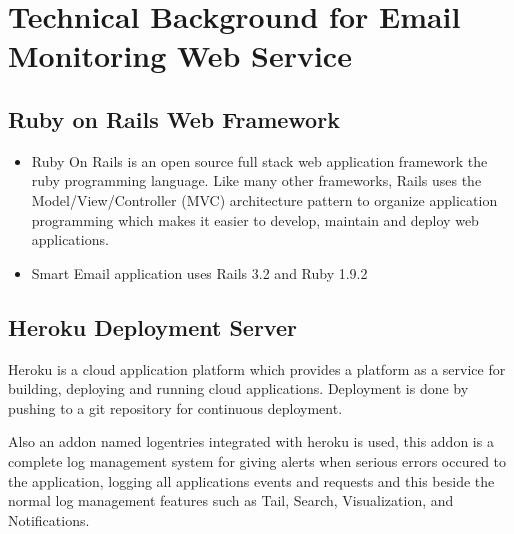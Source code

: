 
\chapter{Technical Background for Email Monitoring Web Service} %

\label{AppendixC} %




\section{Ruby on Rails Web Framework}
\begin{itemize}
 \item Ruby On Rails is an open source full stack web application framework the ruby 
      programming language. Like many other frameworks, Rails uses the 
      Model/View/Controller (MVC) architecture pattern to organize application 
      programming which makes it easier to develop, maintain and deploy web applications.
  \item Smart Email application uses Rails 3.2 and Ruby 1.9.2
\end{itemize}

\section{Heroku Deployment Server}
Heroku is a cloud application platform which provides a platform as a service for 
building, deploying and running cloud applications. Deployment is done by pushing 
to a git repository for continuous deployment.

Also an addon named logentries integrated with heroku is used, this addon is a 
complete log management system for  giving alerts when serious errors occured to 
the application, logging all applications events and requests and this beside 
the normal log management features such as Tail, Search, Visualization, and Notifications.


